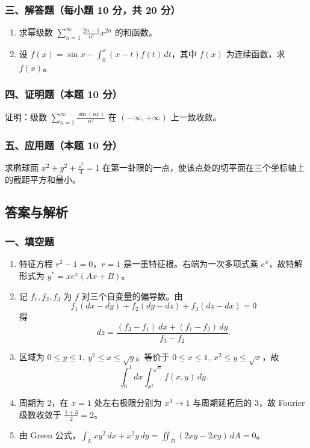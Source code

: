 \subsubsection*{三、解答题（每小题 10 分，共 20 分）}
\begin{enumerate}
  \item 求幂级数 \(\displaystyle \sum_{n=1}^{\infty}\frac{2n-1}{n!}x^{2n}\) 的和函数。
  \item 设 \(\displaystyle f(x)=\sin x-\int_0^x(x-t)f(t)\,dt\)，其中 $f(x)$ 为连续函数，求 $f(x)$。
\end{enumerate}

\subsubsection*{四、证明题（本题 10 分）}
证明：级数 \(\displaystyle \sum_{n=1}^{\infty}\frac{\sin(nx)}{n^2}\) 在 $(-\infty,+\infty)$ 上一致收敛。

\subsubsection*{五、应用题（本题 10 分）}
求椭球面 \(\displaystyle x^2+y^2+\frac{z^2}{4}=1\) 在第一卦限的一点，使该点处的切平面在三个坐标轴上的截距平方和最小。

\subsection{答案与解析}

\subsubsection*{一、填空题}
\begin{enumerate}
  \item 特征方程 $r^2-1=0$，$r=1$ 是一重特征根。右端为一次多项式乘 $e^x$，故特解形式为 \(\displaystyle y^*=xe^x(Ax+B)\)。
  \item 记 $f_1,f_2,f_3$ 为 $f$ 对三个自变量的偏导数。由
  \[
  f_1(dx-dy)+f_2(dy-dz)+f_3(dz-dx)=0
  \]
  得
  \[
  dz=\frac{(f_3-f_1)\,dx+(f_1-f_2)\,dy}{f_3-f_2}.
  \]
  \item 区域为 $0\le y\le1,\ y^2\le x\le\sqrt y$。等价于 $0\le x\le1,\ x^2\le y\le\sqrt x$，故
  \[
  \int_0^1dx\int_{x^2}^{\sqrt x}f(x,y)\,dy.
  \]
  \item 周期为 $2$，在 $x=1$ 处左右极限分别为 $x^3\to1$ 与周期延拓后的 $3$，故 Fourier 级数收敛于 \(\displaystyle \frac{1+3}{2}=2\)。
  \item 由 Green 公式，\(\displaystyle \int_Lxy^2\,dx+x^2y\,dy=\iint_D(2xy-2xy)\,dA=0\)。
\end{enumerate}

